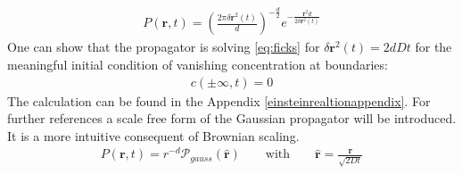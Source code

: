 \documentclass[
  a4paper,BCOR10mm,oneside,
  bibtotoc,idxtotoc,
  headsepline,footsepline,%
  fleqn,openbib
]{scrbook}
\begin{document}
\begin{align}
 P(\bm{r},t)=  \left(\frac{2 \pi \delta \bm{r}^2(t)}{d}\right)^{- \frac{d}{2}} e^{- \frac{\bm{r}^2 d}{2 \delta \bm{r}^2(t)}} \label{propagator}
\end{align}
One can show that the propagator is solving \cref{eq:ficks} for $\delta \bm{r}^2(t)=2dDt$ for the meaningful initial condition of vanishing concentration at boundaries: 
\begin{align}
c(\pm \infty,t)=0
\end{align}
The calculation can be found in the Appendix \ref{einsteinrealtionappendix}.
For further references a scale free form of the Gaussian propagator will be introduced. It is a more intuitive consequent of Brownian scaling.
\begin{align}
P(\bm{r},t)= r^{-d} \mathcal{P}_{gauss}(\hat{\bm{r}})  \qquad \text{with} \qquad \hat{\bm{r}} = \frac{\bm{r}}{\sqrt{2Dt}}
\end{align}
\end{document}
